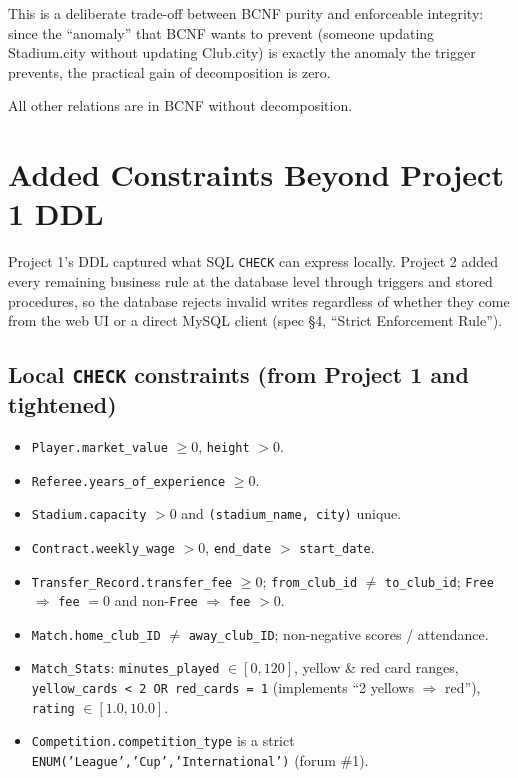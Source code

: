 \documentclass[11pt]{article}
\begin{document}
This is a deliberate trade-off between BCNF purity and enforceable
integrity: since the ``anomaly'' that BCNF wants to prevent (someone
updating Stadium.city without updating Club.city) is exactly the
anomaly the trigger prevents, the practical gain of decomposition is
zero.

All other relations are in BCNF without decomposition.

\section{Added Constraints Beyond Project 1 DDL}

Project 1's DDL captured what SQL \texttt{CHECK} can express locally.
Project 2 added every remaining business rule at the database level
through triggers and stored procedures, so the database rejects invalid
writes regardless of whether they come from the web UI or a direct
MySQL client (spec \S 4, ``Strict Enforcement Rule'').

\subsection{Local \texttt{CHECK} constraints (from Project 1 and tightened)}

\begin{itemize}[leftmargin=*]
  \item \texttt{Player.market\_value} $\geq 0$, \texttt{height} $> 0$.
  \item \texttt{Referee.years\_of\_experience} $\geq 0$.
  \item \texttt{Stadium.capacity} $> 0$ and \texttt{(stadium\_name, city)} unique.
  \item \texttt{Contract.weekly\_wage} $> 0$, \texttt{end\_date} $>$ \texttt{start\_date}.
  \item \texttt{Transfer\_Record.transfer\_fee} $\geq 0$;
    \texttt{from\_club\_id} $\neq$ \texttt{to\_club\_id};
    \texttt{Free} $\Rightarrow$ \texttt{fee} $= 0$
    and non-\texttt{Free} $\Rightarrow$ \texttt{fee} $> 0$.
  \item \texttt{Match.home\_club\_ID} $\neq$ \texttt{away\_club\_ID};
    non-negative scores / attendance.
  \item \texttt{Match\_Stats}: \texttt{minutes\_played} $\in [0, 120]$,
    yellow \& red card ranges, \texttt{yellow\_cards < 2 OR red\_cards = 1}
    (implements ``2 yellows $\Rightarrow$ red''),
    \texttt{rating} $\in [1.0, 10.0]$.
  \item \texttt{Competition.competition\_type} is a strict
    \texttt{ENUM('League','Cup','International')} (forum \#1).
\end{itemize}
\end{document}
